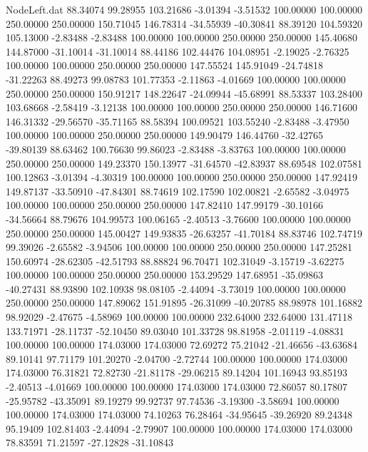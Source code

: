 \begin{filecontents}{NodeLeft.dat}
  88.34074   99.28955  103.21686    -3.01394   -3.51532  100.00000  100.00000  250.00000  250.00000  150.71045  146.78314  -34.55939  -40.30841
  88.39120  104.59320  105.13000    -2.83488   -2.83488  100.00000  100.00000  250.00000  250.00000  145.40680  144.87000  -31.10014  -31.10014
  88.44186  102.44476  104.08951    -2.19025   -2.76325  100.00000  100.00000  250.00000  250.00000  147.55524  145.91049  -24.74818  -31.22263
  88.49273   99.08783  101.77353    -2.11863   -4.01669  100.00000  100.00000  250.00000  250.00000  150.91217  148.22647  -24.09944  -45.68991
  88.53337  103.28400  103.68668    -2.58419   -3.12138  100.00000  100.00000  250.00000  250.00000  146.71600  146.31332  -29.56570  -35.71165
  88.58394  100.09521  103.55240    -2.83488   -3.47950  100.00000  100.00000  250.00000  250.00000  149.90479  146.44760  -32.42765  -39.80139
  88.63462  100.76630   99.86023    -2.83488   -3.83763  100.00000  100.00000  250.00000  250.00000  149.23370  150.13977  -31.64570  -42.83937
  88.69548  102.07581  100.12863    -3.01394   -4.30319  100.00000  100.00000  250.00000  250.00000  147.92419  149.87137  -33.50910  -47.84301
  88.74619  102.17590  102.00821    -2.65582   -3.04975  100.00000  100.00000  250.00000  250.00000  147.82410  147.99179  -30.10166  -34.56664
  88.79676  104.99573  100.06165    -2.40513   -3.76600  100.00000  100.00000  250.00000  250.00000  145.00427  149.93835  -26.63257  -41.70184
  88.83746  102.74719   99.39026    -2.65582   -3.94506  100.00000  100.00000  250.00000  250.00000  147.25281  150.60974  -28.62305  -42.51793
  88.88824   96.70471  102.31049    -3.15719   -3.62275  100.00000  100.00000  250.00000  250.00000  153.29529  147.68951  -35.09863  -40.27431
  88.93890  102.10938   98.08105    -2.44094   -3.73019  100.00000  100.00000  250.00000  250.00000  147.89062  151.91895  -26.31099  -40.20785
  88.98978  101.16882   98.92029    -2.47675   -4.58969  100.00000  100.00000  232.64000  232.64000  131.47118  133.71971  -28.11737  -52.10450
  89.03040  101.33728   98.81958    -2.01119   -4.08831  100.00000  100.00000  174.03000  174.03000   72.69272   75.21042  -21.46656  -43.63684
  89.10141   97.71179  101.20270    -2.04700   -2.72744  100.00000  100.00000  174.03000  174.03000   76.31821   72.82730  -21.81178  -29.06215
  89.14204  101.16943   93.85193    -2.40513   -4.01669  100.00000  100.00000  174.03000  174.03000   72.86057   80.17807  -25.95782  -43.35091
  89.19279   99.92737   97.74536    -3.19300   -3.58694  100.00000  100.00000  174.03000  174.03000   74.10263   76.28464  -34.95645  -39.26920
  89.24348   95.19409  102.81403    -2.44094   -2.79907  100.00000  100.00000  174.03000  174.03000   78.83591   71.21597  -27.12828  -31.10843

\end{filecontents}
